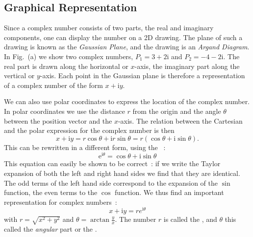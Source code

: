 
\subsection{Graphical Representation}

Since a complex number consists of two parts, the real and imaginary components, one can display the number on a 2D drawing.
The plane of such a drawing is known as the \textit{Gaussian Plane}, and the drawing is an \textit{Argand Diagram}.
In Fig.~(a) we show two complex numbers, $P_1=3+2\mathrm{i}$ and $P_2=-4-2\mathrm{i}$.  The real part is drawn along the 
horizontal or $x$-axis, the imaginary part along the vertical or $y$-axis.  Each point in the Gaussian plane is therefore a representation of a complex number of the form $x+\mathrm{i}y$.

We can also use polar coordinates to express the location of the complex number.  In polar coordinates
we use the distance $r$ from the origin and the angle $\theta$ between the position vector and the $x$-axis.
The relation between the Cartesian and the polar expression for the complex number is then
\begin{equation}
x+\mathrm{i}y=r\cos\theta+\mathrm{i}r\sin\theta=r(\cos\theta+\mathrm{i}\sin\theta).
\end{equation}
This can be rewritten in a different form, using the ~:
\begin{equation}
	\mathrm{e}^{\mathrm{i}\theta}=\cos\theta+\mathrm{i}\sin\theta
\end{equation}
This equation can easily be shown to be correct~:  if we write the Taylor expansion of both the left and right hand sides
we find that they are identical.  The odd terms of the left hand side correspond to the expansion of the $\sin$ function, the
even terms to the $\cos$ function.  We thus find an important representation for complex numbers~:
\begin{equation}
	x+\mathrm{i}y=re^{\mathrm{i}\theta}
\end{equation}
with $r=\sqrt{x^2+y^2}$ and $\theta=\arctan\frac{y}{x}$.  The number $r$ is called the , and $\theta$ this called the \textit{angular} part or the .

